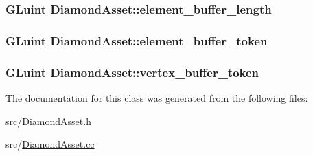 \subsubsection[{element\+\_\+buffer\+\_\+length}]{\setlength{\rightskip}{0pt plus 5cm}G\+Luint Diamond\+Asset\+::element\+\_\+buffer\+\_\+length\hspace{0.3cm}{\ttfamily [private]}}\label{classDiamondAsset_a3fe4461f114f4370a9d800e4425f1c8a}
\hypertarget{classDiamondAsset_aa2ad44c331156835eba1ed5175bde2e6}{}
\subsubsection[{element\+\_\+buffer\+\_\+token}]{\setlength{\rightskip}{0pt plus 5cm}G\+Luint Diamond\+Asset\+::element\+\_\+buffer\+\_\+token\hspace{0.3cm}{\ttfamily [private]}}\label{classDiamondAsset_aa2ad44c331156835eba1ed5175bde2e6}
\hypertarget{classDiamondAsset_ac1965c61c0cfd5719c5c01bac98fd312}{}
\subsubsection[{vertex\+\_\+buffer\+\_\+token}]{\setlength{\rightskip}{0pt plus 5cm}G\+Luint Diamond\+Asset\+::vertex\+\_\+buffer\+\_\+token\hspace{0.3cm}{\ttfamily [private]}}\label{classDiamondAsset_ac1965c61c0cfd5719c5c01bac98fd312}


The documentation for this class was generated from the following files\+:\begin{DoxyCompactItemize}
\item 
src/\hyperlink{DiamondAsset_8h}{Diamond\+Asset.\+h}\item 
src/\hyperlink{DiamondAsset_8cc}{Diamond\+Asset.\+cc}\end{DoxyCompactItemize}
